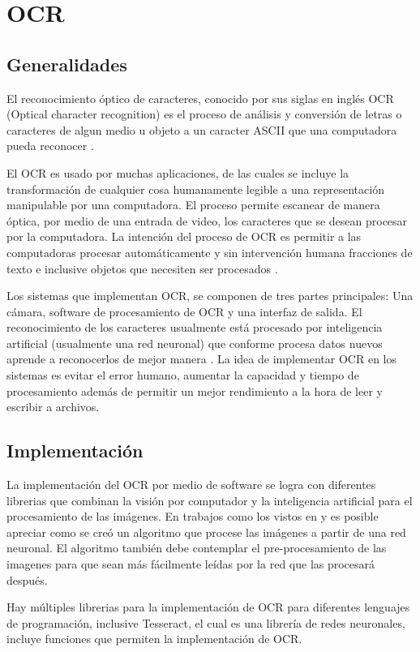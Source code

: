 \section{OCR}
\subsection{Generalidades}
El reconocimiento óptico de caracteres, conocido por sus siglas en inglés OCR (Optical character recognition) es el proceso de análisis y conversión de letras o caracteres de algun medio u objeto a un caracter ASCII que una computadora pueda reconocer \cite{nallasamy}.
\par
El OCR es usado por muchas aplicaciones, de las cuales se incluye la transformación de cualquier cosa humanamente legible a una representación manipulable por una computadora. El proceso permite escanear de manera óptica, por medio de una entrada de video, los caracteres que se desean procesar por la computadora. La intención del proceso de OCR es permitir a las computadoras procesar automáticamente y sin intervención humana fracciones de texto e inclusive objetos que necesiten ser procesados \cite{Shah2009}.
\par
Los sistemas que implementan OCR, se componen de tres partes principales: Una cámara, software de procesamiento de OCR y una interfaz de salida. El reconocimiento de los caracteres usualmente está procesado por inteligencia artificial (usualmente una red neuronal) que conforme procesa datos nuevos aprende a reconocerlos de mejor manera \cite{Shah2009}. La idea de implementar OCR en los sistemas es evitar el error humano, aumentar la capacidad y tiempo de procesamiento además de permitir un mejor rendimiento a la hora de leer y escribir a archivos. 

\subsection{Implementación}
La implementación del OCR por medio de software se logra con diferentes librerias que combinan la visión por computador y la inteligencia artificial para el procesamiento de las imágenes. En trabajos como los vistos en \cite{nallasamy} y \cite{Shah2009} es posible apreciar como se creó un algoritmo que procese las imágenes a partir de una red neuronal. El algoritmo también debe contemplar el pre-procesamiento de las imagenes para que sean más fácilmente leídas por la red que las procesará después.
\par
Hay múltiples librerias para la implementación de OCR para diferentes lenguajes de programación, inclusive Tesseract, el cual es una librería de redes neuronales, incluye funciones que permiten la implementación de OCR.

